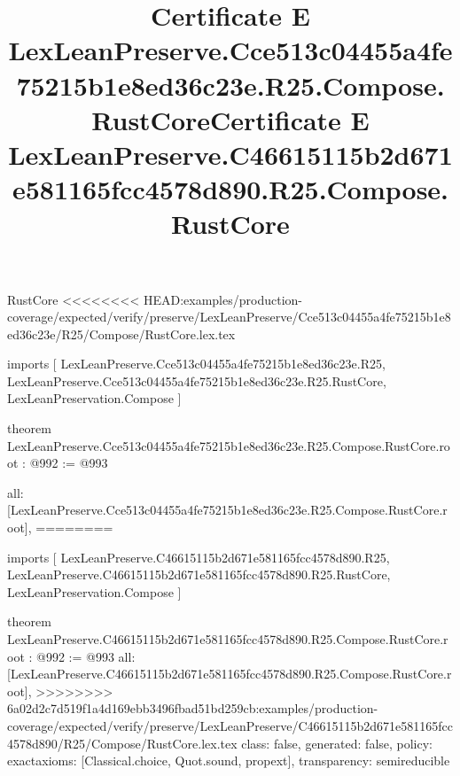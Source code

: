 \begin{lexlean}{RustCore}
<<<<<<<< HEAD:examples/production-coverage/expected/verify/preserve/LexLeanPreserve/Cce513c04455a4fe75215b1e8ed36c23e/R25/Compose/RustCore.lex.tex
\title{Certificate E LexLeanPreserve.Cce513c04455a4fe75215b1e8ed36c23e.R25.Compose.RustCore}
\begin{coremodule}
imports [
  LexLeanPreserve.Cce513c04455a4fe75215b1e8ed36c23e.R25,
  LexLeanPreserve.Cce513c04455a4fe75215b1e8ed36c23e.R25.RustCore,
  LexLeanPreservation.Compose
]

theorem LexLeanPreserve.Cce513c04455a4fe75215b1e8ed36c23e.R25.Compose.RustCore.root : @992 := @993 {
  all: [LexLeanPreserve.Cce513c04455a4fe75215b1e8ed36c23e.R25.Compose.RustCore.root],
========
\title{Certificate E LexLeanPreserve.C46615115b2d671e581165fcc4578d890.R25.Compose.RustCore}
\begin{coremodule}
imports [
  LexLeanPreserve.C46615115b2d671e581165fcc4578d890.R25,
  LexLeanPreserve.C46615115b2d671e581165fcc4578d890.R25.RustCore,
  LexLeanPreservation.Compose
]

theorem LexLeanPreserve.C46615115b2d671e581165fcc4578d890.R25.Compose.RustCore.root : @992 := @993 {
  all: [LexLeanPreserve.C46615115b2d671e581165fcc4578d890.R25.Compose.RustCore.root],
>>>>>>>> 6a02d2c7d519f1a4d169ebb3496fbad51bd259cb:examples/production-coverage/expected/verify/preserve/LexLeanPreserve/C46615115b2d671e581165fcc4578d890/R25/Compose/RustCore.lex.tex
  class: false,
  generated: false,
  policy: exact{axioms: [Classical.choice, Quot.sound, propext]},
  transparency: semireducible
}


\end{coremodule}}
\end{coremodule}
\end{lexlean}
